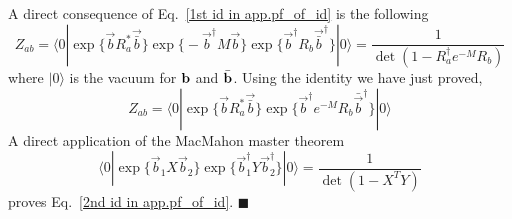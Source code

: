 A direct consequence of Eq.~\eqref{1st id in app.pf_of_id} is the following
\begin{equation}
\label{2nd id in app.pf_of_id}
Z_{ab} = \langle 0 | \exp\Big\{ \vec{b} R_a^* \vec{\bar{b}}\Big\} \exp\Big\{ - \vec{b}^{\dagger} M  \vec{b} \Big\}   \exp\Big\{  \vec{b}^{\dagger} R_b  \vec{\bar{b}}^{\dagger}\Big\}  |0  \rangle  = \frac{1}{\det( 1- R_a^{\dagger} e^{-M} R_b )} 
\end{equation}
where $|0\rangle$ is the vacuum for ${\bf b}$ and $\bar{\bf b}$. Using the identity we have just proved, 
\begin{equation}
Z_{ab} =   \langle 0 | \exp\Big\{ \vec{b} R_a^* \vec{\bar{b}}\Big\}  \exp \Big\{ \vec{b}^{\dagger} e^{-M}  R_b \bar{\vec{b}}^{\dagger}  \Big\}  |0 \rangle 
\end{equation}
A direct application of the MacMahon master theorem
\begin{equation}
  \langle 0 | \exp \Big\{ \vec{b}_1 X \vec{b}_2 \Big\}  \exp \Big\{ \vec{b}^{\dagger}_1 Y \vec{b}^{\dagger}_2 \Big\}|0  \rangle 
 = \frac{1}{\det(1 - X^T Y )}
\end{equation}
proves Eq.~\eqref{2nd id in app.pf_of_id}. \hfill$\blacksquare$


